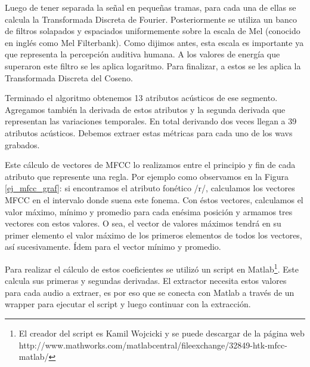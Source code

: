 Luego de tener separada la señal en pequeñas tramas, para cada una de ellas se calcula la Transformada Discreta de Fourier. Posteriormente se utiliza un banco de filtros solapados y espaciados uniformemente sobre la escala de Mel (conocido en inglés como Mel Filterbank). Como dijimos antes, esta escala es importante ya que representa la percepción auditiva humana. A los valores de energía que superaron este filtro se les aplica logaritmo. Para finalizar, a estos se les aplica la Transformada Discreta del Coseno.


Terminado el algoritmo obtenemos 13 atributos acústicos de ese segmento. Agregamos también la derivada de estos atributos y la segunda derivada que representan las variaciones temporales. En total derivando dos veces llegan a 39 atributos acústicos. Debemos extraer estas métricas para cada uno de los wavs grabados.

Este cálculo de vectores de MFCC lo realizamos entre el principio y fin de cada atributo que represente una regla. Por ejemplo como observamos en la Figura \ref{ej_mfcc_graf}: si encontramos el atributo fonético /r/, calculamos los vectores MFCC en el intervalo donde suena este fonema. Con éstos vectores, calculamos el valor máximo, mínimo y promedio para cada enésima posición y armamos tres vectores con estos valores. O sea, el vector de valores máximos tendrá en su primer elemento el valor máximo de los primeros elementos de todos los vectores, así sucesivamente. Ídem para el vector mínimo y promedio. 

Para realizar el cálculo de estos coeficientes se utilizó un script en Matlab\footnote{El creador del script es Kamil Wojcicki y se puede descargar de la página web http://www.mathworks.com/matlabcentral/fileexchange/32849-htk-mfcc-matlab/}. Este calcula  sus primeras y segundas derivadas. El extractor necesita estos valores para cada audio a extraer, es por eso que se conecta con Matlab a través de un wrapper para ejecutar el script y luego continuar con la extracción.

